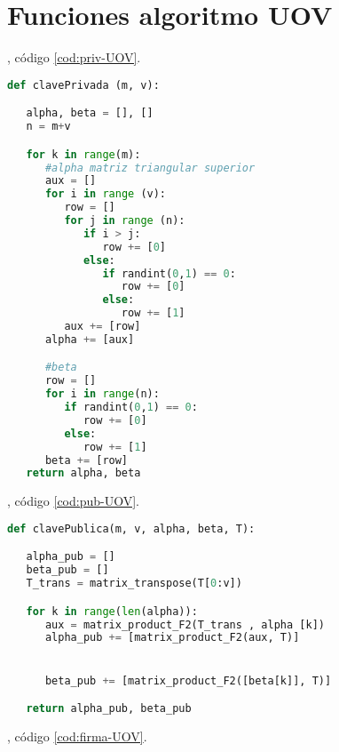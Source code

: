 \section{Funciones algoritmo UOV}

, código \ref{cod:priv-UOV}.\\

\begin{lstlisting}[language=Python,caption=Generación clave privada, label=cod:priv-UOV]
def clavePrivada (m, v):

   alpha, beta = [], []
   n = m+v

   for k in range(m):
      #alpha matriz triangular superior
      aux = []
      for i in range (v):
         row = []
         for j in range (n):
            if i > j:
               row += [0]
            else:
               if randint(0,1) == 0:
                  row += [0]
               else:
                  row += [1]
         aux += [row]
      alpha += [aux]

      #beta
      row = []
      for i in range(n):
         if randint(0,1) == 0:
            row += [0]
         else:
            row += [1]
      beta += [row]
   return alpha, beta
\end{lstlisting}

, código \ref{cod:pub-UOV}.\\

\begin{lstlisting}[language=Python,caption=Generación clave pública, label=cod:pub-UOV]
def clavePublica(m, v, alpha, beta, T):

   alpha_pub = []
   beta_pub = []
   T_trans = matrix_transpose(T[0:v])

   for k in range(len(alpha)):
      aux = matrix_product_F2(T_trans , alpha [k])
      alpha_pub += [matrix_product_F2(aux, T)]


      beta_pub += [matrix_product_F2([beta[k]], T)]

   return alpha_pub, beta_pub
\end{lstlisting}

, código \ref{cod:firma-UOV}.\\

